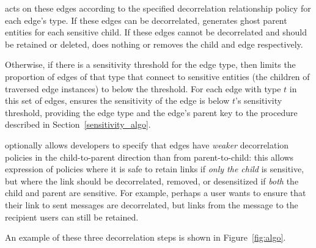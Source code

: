 \begin{enumerate}
        \sys acts on these edges according to the specified decorrelation relationship policy for
        each edge's type. If these edges can be decorrelated, \sys generates ghost parent entities
        for each sensitive child.  If these edges cannot be decorrelated and should be retained or
        deleted, \sys does nothing or removes the child and edge respectively. 
        
        Otherwise, if there is a sensitivity threshold for the edge type, then \sys limits the
        proportion of edges of that type that connect to sensitive entities (the children of
        traversed edge instances) to below the threshold. 
        For each edge with type $t$ in this set of edges, \sys ensures the
        sensitivity of the edge is below $t$'s sensitivity threshold, providing the edge type and the edge's
        parent key to the procedure described in Section~\ref{sensitivity_algo}. 

        \sys optionally allows developers to specify that edges have \emph{weaker}
        decorrelation policies in the child-to-parent direction than from parent-to-child: this
        allows expression of policies where it is safe to retain links if \emph{only the child} is
        sensitive, but where the link should be decorrelated, removed, or desensitized if
        \emph{both} the child
        and parent are sensitive. For example, perhaps a user wants to ensure that their link to
        sent messages are decorrelated, but links from the message to the recipient users 
        can still be retained.
\end{enumerate}

An example of these three decorrelation steps is shown in Figure~\ref{fig:algo}.

